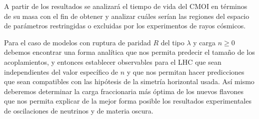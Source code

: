  A partir de los resultados se analizará el tiempo de vida del CMOI  en términos de su masa con el fin de obtener y analizar cuáles serían las regiones del espacio de parámetros restringidas o excluidas por los experimentos de rayos cósmicos. 



Para el caso de modelos con ruptura de paridad $R$ del tipo $\lambda$ y carga $n\ge 0$ debemos encontrar una forma analítica que nos permita predecir el tamaño de los acoplamientos, y entonces establecer observables para el LHC que sean independientes del valor específico de $n$ y que nos permitan hacer predicciones que sean compatibles con las hipótesis de la simetría horizontal usada. Así mismo deberemos determinar la carga fraccionaria más óptima de los nuevos flavones que nos permita explicar de la mejor forma posible los resultados experimentales de oscilaciones de neutrinos y de materia oscura.



